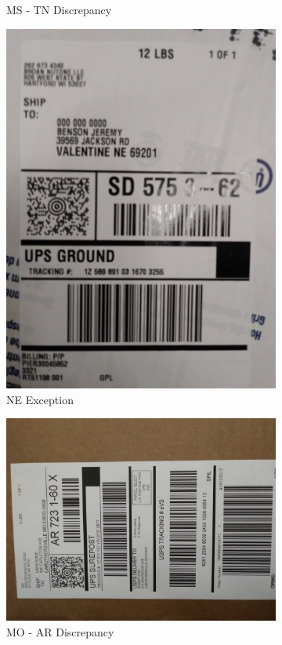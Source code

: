 \documentclass[12pt]{article}
\begin{document}
\begin{figure}[H]
\begin{subfigure}{0.5\textwidth}
\caption{MS - TN Discrepancy}
\end{subfigure}
\begin{subfigure}{0.5\textwidth}
\centering
\includegraphics[width=0.7\linewidth]{20171222_194105} 
\caption{NE Exception}
\end{subfigure}
\begin{subfigure}{0.5\textwidth}
\centering
\includegraphics[width=0.7\linewidth]{20171222_184324} 
\caption{MO - AR Discrepancy}
\end{subfigure}
\begin{subfigure}{0.5\textwidth}
\centering

\end{subfigure}
\end{figure}
\end{document}
